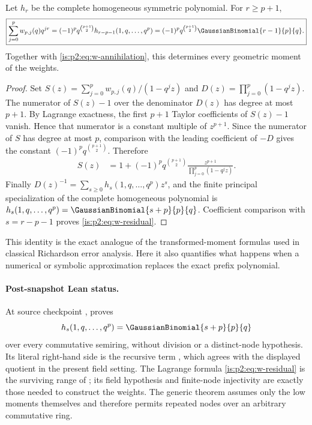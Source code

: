 \begin{theorem}
\label{is:p2:thm:geometric-lagrange-residual}
Let $h_r$ be the complete homogeneous symmetric polynomial.  For $r\ge p+1$,
\begin{equation}
 \boxed{
 \sum_{j=0}^{p}w_{p,j}(q)q^{jr}
 =(-1)^pq^{\binom{p+1}{2}}
 h_{r-p-1}(1,q,\ldots,q^p)
 =(-1)^pq^{\binom{p+1}{2}}\GaussianBinomial{r-1}{p}{q}.
 }
\label{is:p2:eq:w-residual}
\end{equation}
Together with \eqref{is:p2:eq:w-annihilation}, this determines every
geometric moment of the weights.
\end{theorem}

\begin{proof}
Set $S(z)=\sum_{j=0}^{p}w_{p,j}(q)/(1-q^jz)$ and
$D(z)=\prod_{j=0}^{p}(1-q^jz)$.  The numerator of $S(z)-1$ over the
denominator $D(z)$ has degree at most $p+1$.  By Lagrange exactness, the first
$p+1$ Taylor coefficients of $S(z)-1$ vanish.  Hence that numerator is a
constant multiple of $z^{p+1}$.  Since the numerator of $S$ has degree at
most $p$, comparison with the leading coefficient of $-D$ gives the constant
$(-1)^pq^{\binom{p+1}{2}}$.  Therefore
\begin{align*}
 S(z)
 &=1+(-1)^pq^{\binom{p+1}{2}}
 \frac{z^{p+1}}{\prod_{j=0}^{p}(1-q^jz)}.
\end{align*}
Finally
$D(z)^{-1}=\sum_{s\ge0}h_s(1,q,\ldots,q^p)z^s$, and the finite principal
specialization of the complete homogeneous polynomial is
$h_s(1,q,\ldots,q^p)=\GaussianBinomial{s+p}{p}{q}$.  Coefficient comparison
with $s=r-p-1$ proves \eqref{is:p2:eq:w-residual}.
\end{proof}

This identity is the exact analogue of the transformed-moment formulas used
in classical Richardson error analysis.  Here it also quantifies what happens
when a numerical or symbolic approximation replaces the exact prefix
polynomial.

\paragraph{Post-snapshot Lean status.}
At source checkpoint ,
 proves
\[
 h_s(1,q,\ldots,q^p)=\GaussianBinomial{s+p}{p}{q}
\]
over every commutative semiring, without division or a distinct-node
hypothesis.  Its literal right-hand side is the recursive term
, which agrees with the displayed quotient
in the present field setting.  The Lagrange formula \eqref{is:p2:eq:w-residual} is
the surviving range of ; its
field hypothesis and finite-node injectivity are exactly those needed to
construct the weights.  The generic theorem
 assumes only the low moments
themselves and therefore permits repeated nodes over an arbitrary commutative
ring.

